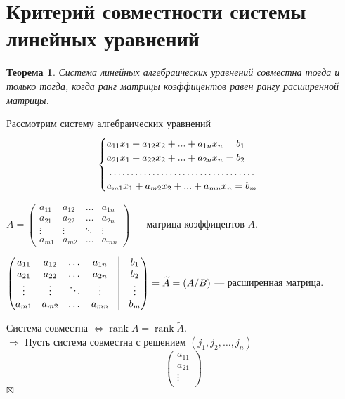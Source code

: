 \documentclass[a4paper, 12pt]{article}
\newtheorem*{theorem}{Теорема}
\newenvironment{Proof}
{\par\noindent{$\blacklozenge$}}
{\hfill$\scriptstyle\boxtimes$}
\newcommand{\rank}{\operatorname{rank}}
\begin{document}
\section{Критерий совместности системы линейных уравнений}
\begin{theorem}
	Система линейных алгебраических уравнений совместна тогда и только тогда, когда ранг матрицы коэффицентов равен рангу расширенной матрицы.
\end{theorem}
\begin{Proof}
	Рассмотрим систему алгебраических уравнений
   $$ \begin{cases}
        a_{11}x_1+a_{12}x_2+...+a_{1n}x_n=b_1\\
        a_{21}x_1+a_{22}x_2+...+a_{2n}x_n=b_2\\
        \dotfill\\
        a_{m1}x_1+a_{m2}x_2+...+a_{mn}x_n=b_m
    \end{cases}$$
    \begin{center}
    $A = \begin{pmatrix}
    a_{11} & a_{12} & \dots & a_{1n}\\
    a_{21} & a_{22} & \dots & a_{2n}\\
    \vdots & \vdots & \ddots & \vdots\\
    a_{m1} & a_{m2} & \dots & a_{mn}
    \end{pmatrix}$
    --- матрица коэффицентов $A$.\\
    \end{center}
    \begin{center}
     $\begin{pmatrix}
    a_{11} & a_{12} & \dots & a_{1n} & \vline & b_1\\
    a_{21} & a_{22} & \dots & a_{2n} & \vline & b_2\\
    \vdots & \vdots & \ddots & \vdots & \vline & \vdots\\
    a_{m1} & a_{m2} & \dots & a_{mn} & \vline & b_m
    \end{pmatrix} =
    \widetilde{A} = (A/B)$ --- расширенная матрица.   
    \end{center}
    Система совместна $\Leftrightarrow \rank A=\rank\widetilde{A}$. \\
    $\Rightarrow$ Пусть система совместна с решением $(j_1,j_2, \dots, j_n)$\\
    $$\begin{pmatrix}
    a_{11}\\
    a_{21}\\
    \vdots\\

\end{pmatrix}$$
\end{Proof}
\end{document}
